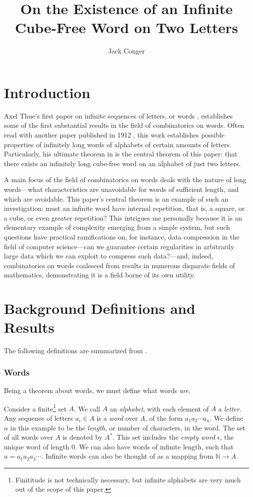 \documentclass[letterpaper,12pt]{article}
\title{On the Existence of an Infinite Cube-Free Word on Two Letters}
\author{Jack Conger}
\begin{document}
\maketitle

\section{Introduction}

Axel Thue's first paper on infinite sequences of letters, or words \cite{thue}, establishes some of the first substantial results in the field of combinatorics on words. Often read with another paper published in 1912 \cite{otherthue}, this work establishes possible properties of infinitely long words of alphabets of certain amounts of letters. Particularly, his ultimate theorem in \cite{thue} is the central theorem of this paper: that there exists an infinitely long cube-free word on an alphabet of just two letters.

A main focus of the field of combinatorics on words deals with the nature of long words---what characteristics are unavoidable for words of sufficient length, and which are avoidable. This paper's central theorem is an example of such an investigation: must an infinite word have internal repetition, that is, a square, or a cube, or even greater repetition? This intrigues me personally because it is an elementary example of complexity emerging from a simple system, but such questions have practical ramifications on, for instance, data compression in the field of computer science---can we guarantee certain regularities in arbitrarily large data which we can exploit to compress such data?---and, indeed, combinatorics on words coalesced from results in numerous disparate fields of mathematics, demonstrating it is a field borne of its own utility.

\section{Background Definitions and Results}

The following definitions are summarized from \cite{berstel, lothaire}.

\subsubsection*{Words}

Being a theorem about words, we must define what words \emph{are}.

Consider a finite\footnote{Finititude is not technically necessary, but infinite alphabets are very much out of the scope of this paper.} set $A$. We call $A$ an \emph{alphabet}, with each element of $A$ a \emph{letter}. Any sequence of letters $a_i \in A$ is a \emph{word} over $A$, of the form $a_1 a_2 \cdots a_n$. We define $n$ in this example to be the \emph{length}, or number of characters, in the word. The set of all words over $A$ is denoted by $A^*$. This set includes the \emph{empty word} $\epsilon$, the unique word of length 0. We can also have words of infinite length, such that $u = a_1 a_2 a_3 \cdots$. Infinite words can also be thought of as a mapping from $\mathbb{N} \to A$.
\end{document}
